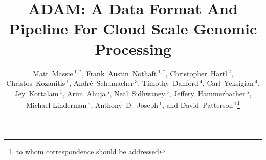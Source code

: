 \documentclass{bioinfo}
\begin{document}

\title[ADAM: Cloud Scale Genomic Processing]{ADAM: A Data Format And Pipeline For Cloud Scale Genomic Processing}
\author[Massie \textit{et~al}]{Matt~Massie\,$^{1,*}$, Frank~Austin~Nothaft\,$^{1,*}$, Christopher~Hartl\,$^{2}$, Christos~Kozanitis\,$^1$,
Andr\'{e}~Schumacher\,$^3$, Timothy~Danford\,$^4$, Carl~Yeksigian\,$^4$, Jey~Kottalam\,$^1$, Arun~Ahuja\,$^5$, Neal~Sidhwaney\,$^5$,
Jeffery~Hammerbacher\,$^5$, Michael Linderman\,$^5$, Anthony~D.~Joseph\,$^1$, and David~Patterson$\,^1$\footnote{to whom correspondence
should be addressed}}
\address{$^{1}$Department of Electrical Engineering and Computer Science, University of California, Berkeley, CA\\
$^{2}$The Broad Institute of MIT and Harvard, Cambridge, MA\\
$^{3}$International Computer Science Institute (ICSI), University of California, Berkeley, CA\\
$^{4}$GenomeBridge, Cambridge, MA\\
$^{5}$Carl Icahn School of Medicine at Mount Sinai, New York, NY}



\maketitle
\end{document}
